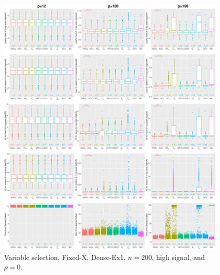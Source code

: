 \begin{figure}[!ht]
\centering
\includegraphics[width=\textwidth]{figures/supplement/fixedx/subset_selection/Dense-Ex1_n200_hsnr_rho0.eps}
\caption{Variable selection, Fixed-X, Dense-Ex1, $n=200$, high signal, and $\rho=0$.}
\end{figure}
\clearpage
